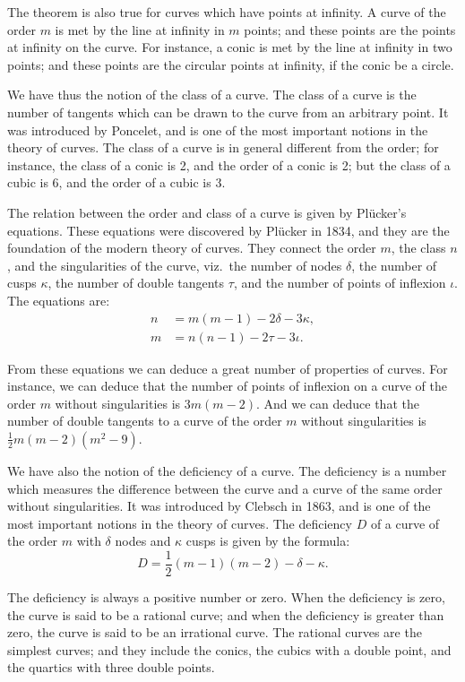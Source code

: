 \documentclass[11pt,a4paper]{article}
\begin{document}
The theorem is also true for curves which have points at infinity. A
curve of the order $m$ is met by the line at infinity in $m$ points;
and these points are the points at infinity on the curve. For
instance, a conic is met by the line at infinity in two points; and
these points are the circular points at infinity, if the conic be a
circle.

We have thus the notion of the class of a curve. The class of a curve
is the number of tangents which can be drawn to the curve from an
arbitrary point. It was introduced by Poncelet, and is one of the
most important notions in the theory of curves. The class of a curve
is in general different from the order; for instance, the class of a
conic is 2, and the order of a conic is 2; but the class of a cubic is
6, and the order of a cubic is 3.

The relation between the order and class of a curve is given by
Pl\"{u}cker's equations. These equations were discovered by Pl\"{u}cker
in 1834, and they are the foundation of the modern theory of curves.
They connect the order $m$, the class $n$, and the singularities of the
curve, viz.\ the number of nodes $\delta$, the number of cusps $\kappa$,
the number of double tangents $\tau$, and the number of points of
inflexion $\iota$. The equations are:
\begin{align*}
n &= m(m-1) - 2\delta - 3\kappa,\\
m &= n(n-1) - 2\tau - 3\iota.
\end{align*}

From these equations we can deduce a great number of properties of
curves. For instance, we can deduce that the number of points of
inflexion on a curve of the order $m$ without singularities is
$3m(m-2)$. And we can deduce that the number of double tangents to a
curve of the order $m$ without singularities is
$\frac{1}{2}m(m-2)(m^2-9)$.

We have also the notion of the deficiency of a curve. The deficiency
is a number which measures the difference between the curve and a curve
of the same order without singularities. It was introduced by Clebsch
in 1863, and is one of the most important notions in the theory of
curves. The deficiency $D$ of a curve of the order $m$ with $\delta$
nodes and $\kappa$ cusps is given by the formula:
\[
D = \frac{1}{2}(m-1)(m-2) - \delta - \kappa.
\]

The deficiency is always a positive number or zero. When the
deficiency is zero, the curve is said to be a rational curve; and when
the deficiency is greater than zero, the curve is said to be an
irrational curve. The rational curves are the simplest curves; and
they include the conics, the cubics with a double point, and the
quartics with three double points.
\end{document}
